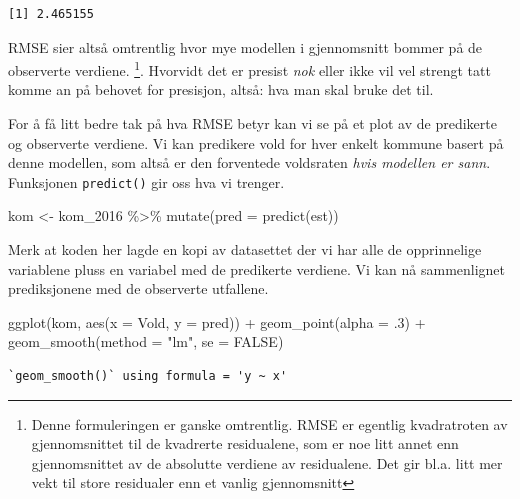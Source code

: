 \documentclass[
  letterpaper,
  DIV=11,
  numbers=noendperiod]{scrreprt}
\newenvironment{Shaded}{\begin{snugshade}}{\end{snugshade}}
\newcommand{\AttributeTok}[1]{\textcolor[rgb]{0.40,0.45,0.13}{#1}}
\newcommand{\ConstantTok}[1]{\textcolor[rgb]{0.56,0.35,0.01}{#1}}
\newcommand{\DecValTok}[1]{\textcolor[rgb]{0.68,0.00,0.00}{#1}}
\newcommand{\FunctionTok}[1]{\textcolor[rgb]{0.28,0.35,0.67}{#1}}
\newcommand{\NormalTok}[1]{\textcolor[rgb]{0.00,0.23,0.31}{#1}}
\newcommand{\OtherTok}[1]{\textcolor[rgb]{0.00,0.23,0.31}{#1}}
\newcommand{\SpecialCharTok}[1]{\textcolor[rgb]{0.37,0.37,0.37}{#1}}
\newcommand{\StringTok}[1]{\textcolor[rgb]{0.13,0.47,0.30}{#1}}
\theoremstyle{definition}
\theoremstyle{remark}
\begin{document}
\begin{verbatim}
[1] 2.465155
\end{verbatim}

RMSE sier altså omtrentlig hvor mye modellen i gjennomsnitt bommer på de
observerte verdiene. \footnote{Denne formuleringen er ganske omtrentlig.
  RMSE er egentlig kvadratroten av gjennomsnittet til de kvadrerte
  residualene, som er noe litt annet enn gjennomsnittet av de absolutte
  verdiene av residualene. Det gir bl.a. litt mer vekt til store
  residualer enn et vanlig gjennomsnitt}. Hvorvidt det er presist
\emph{nok} eller ikke vil vel strengt tatt komme an på behovet for
presisjon, altså: hva man skal bruke det til.

For å få litt bedre tak på hva RMSE betyr kan vi se på et plot av de
predikerte og observerte verdiene. Vi kan predikere vold for hver enkelt
kommune basert på denne modellen, som altså er den forventede voldsraten
\emph{hvis modellen er sann}. Funksjonen \texttt{predict()} gir oss hva
vi trenger.

\begin{Shaded}
\begin{Highlighting}[]
\NormalTok{kom }\OtherTok{\textless{}{-}}\NormalTok{ kom\_2016 }\SpecialCharTok{\%\textgreater{}\%} 
  \FunctionTok{mutate}\NormalTok{(}\AttributeTok{pred =} \FunctionTok{predict}\NormalTok{(est))}
\end{Highlighting}
\end{Shaded}

Merk at koden her lagde en kopi av datasettet der vi har alle de
opprinnelige variablene pluss en variabel med de predikerte verdiene. Vi
kan nå sammenlignet prediksjonene med de observerte utfallene.

\begin{Shaded}
\begin{Highlighting}[]
\FunctionTok{ggplot}\NormalTok{(kom, }\FunctionTok{aes}\NormalTok{(}\AttributeTok{x =}\NormalTok{ Vold, }\AttributeTok{y =}\NormalTok{ pred)) }\SpecialCharTok{+}
  \FunctionTok{geom\_point}\NormalTok{(}\AttributeTok{alpha =}\NormalTok{ .}\DecValTok{3}\NormalTok{) }\SpecialCharTok{+}
  \FunctionTok{geom\_smooth}\NormalTok{(}\AttributeTok{method =} \StringTok{"lm"}\NormalTok{, }\AttributeTok{se =} \ConstantTok{FALSE}\NormalTok{)}
\end{Highlighting}
\end{Shaded}

\begin{verbatim}
`geom_smooth()` using formula = 'y ~ x'
\end{verbatim}
\end{document}
